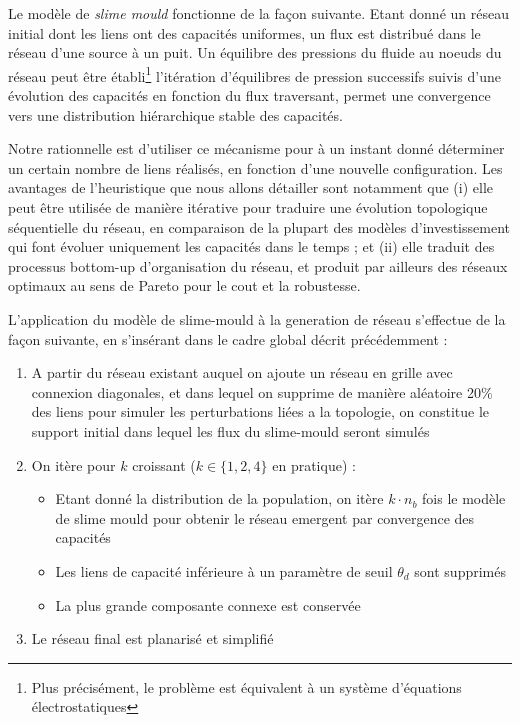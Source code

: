 Le modèle de \emph{slime mould} fonctionne de la façon suivante. Etant donné un réseau initial dont les liens ont des capacités uniformes, un flux est distribué dans le réseau d'une source à un puit. Un équilibre des pressions du fluide au noeuds du réseau peut être établi\footnote{Plus précisément, le problème est équivalent à un système d'équations électrostatiques}
 l'itération d'équilibres de pression successifs suivis d'une évolution des capacités en fonction du flux traversant, permet une convergence vers une distribution hiérarchique stable des capacités.

Notre rationnelle est d'utiliser ce mécanisme pour à un instant donné déterminer un certain nombre de liens réalisés, en fonction d'une nouvelle configuration. Les avantages de l'heuristique que nous allons détailler sont notamment que (i) elle peut être utilisée de manière itérative pour traduire une évolution topologique séquentielle du réseau, en comparaison de la plupart des modèles d'investissement qui font évoluer uniquement les capacités dans le temps ; et (ii) elle traduit des processus bottom-up d'organisation du réseau, et produit par ailleurs des réseaux optimaux au sens de Pareto pour le cout et la robustesse.


L'application du modèle de slime-mould à la generation de réseau s'effectue de la façon suivante, en s'insérant dans le cadre global décrit précédemment :

\begin{enumerate}
	\item A partir du réseau existant auquel on ajoute un réseau en grille avec connexion diagonales, et dans lequel on supprime de manière aléatoire 20\% des liens pour simuler les perturbations liées a la topologie, on constitue le support initial dans lequel les flux du slime-mould seront simulés 
	\item On itère pour $k$ croissant ($k\in \{ 1,2,4 \}$ en pratique) :
	\begin{itemize}
		\item Etant donné la distribution de la population, on itère $k\cdot n_b$ fois le modèle de slime mould pour obtenir le réseau emergent par convergence des capacités
		\item Les liens de capacité inférieure à un paramètre de seuil $\theta_d$ sont supprimés
		\item La plus grande composante connexe est conservée
	\end{itemize}
	\item Le réseau final est planarisé et simplifié
\end{enumerate}



